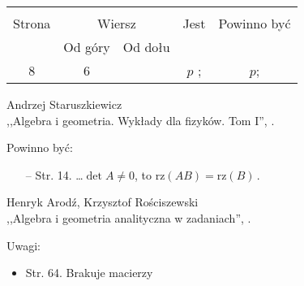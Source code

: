 \documentclass[a4paper,11pt]{article}
\begin{document}
\begin{center}
  \begin{tabular}{|c|c|c|c|c|}
    \hline
    & \multicolumn{2}{c|}{} & & \\
    Strona & \multicolumn{2}{c|}{Wiersz} & Jest
                              & Powinno być \\ \cline{2-3}
    & Od góry & Od dołu & & \\
    \hline
    8   & 6 & & $p$ ; & $p$; \\
    \hline
  \end{tabular}
\end{center}










\begin{center}
  Andrzej Staruszkiewicz \\
  ,,Algebra i geometria. Wykłady dla fizyków. Tom I'', \cite{ASAG}.
\end{center}


Powinno być:
\begin{itemize}
\item[--] Str. 14. \ldots $\det A \neq 0$, to
  $\textrm{rz} ( AB ) = \textrm{rz} ( B ) \, .$
\end{itemize}


\begin{center}
  Henryk Arodź, Krzysztof Rościszewski\\
  ,,Algebra i geometria analityczna w zadaniach'', \cite{AR}.
\end{center}


Uwagi:
\begin{itemize}
\item Str. 64. Brakuje macierzy %
\end{itemize}
\end{document}
